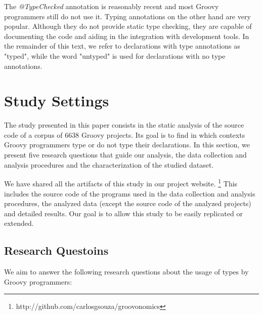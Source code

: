 \documentclass[]{sigplanconf}
\begin{document}
The \emph{@TypeChecked} annotation is reasonably recent and most Groovy programmers still do not use it. 
Typing annotations on the other hand are very popular.
Although they do not provide static type checking, they are capable of documenting the code and aiding in the integration with development tools.
In the remainder of this text, we refer to declarations with type annotations as "typed", while the word "untyped" is used for declarations with no type annotations.







%
%

\section{Study Settings\label{settings}}
The study presented in this paper consists in the static analysis of the source code of a corpus of 6638 Groovy projects.
Its goal is to find in which contexts Groovy programmers type or do not type their declarations.
In this section, we present five research questions that guide our analysis, the data collection and analysis procedures and the characterization of the studied dataset.

We have shared all the artifacts of this study in our project website. \footnote{http://github.com/carlosgsouza/groovonomics}
This includes the source code of the programs used in the data collection and analysis procedures, the analyzed data (except the source code of the analyzed projects) and detailed results.
Our goal is to allow this study to be easily replicated or extended.

\subsection{Research Questoins\label{questions}}
We aim to answer the following research questions about the usage of types by Groovy programmers:
\end{document}
